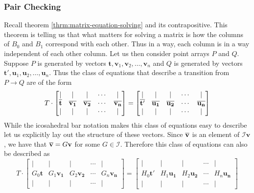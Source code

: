\documentclass[a4paper,10pt]{article}
\theoremstyle{plain}
\theoremstyle{definition}
\theoremstyle{remark}
\renewcommand{\vec}[1]{\mathbf{#1}}
\begin{document}
\subsubsection{Pair Checking}
Recall theorem \ref{thrm:matrix-equation-solving} and its contrapositive.
This theorem is telling us that what matters for solving a matrix is how the columns of \( B_0 \) and \( B_1 \) correspond with each other.
Thus in a way, each column is in a way independent of each other column.
Let us then consider point arrays \( P \) and \( Q \).
Suppose \( P \) is generated by vectors \(\vec{t}, \vec{v}_1, \vec{v}_2, \dots, \vec{v}_n\) and \( Q \) is generated by vectors \(\vec{t'}, \vec{u}_1, \vec{u}_2, \dots, \vec{u}_n\).
Thus the class of equations that describe a transition from \( P \to Q \) are of the form
\begin{equation*}
	T
	\cdot
	\begin{bmatrix}
		| & | & | & \cdots & | \\
		\icobar{t} & \icobar{v_1} & \icobar{v_2} & \cdots & \icobar{v_n} \\
		| & | & | & \cdots & |
	\end{bmatrix}
	=
	\begin{bmatrix}
		| & | & | & \cdots & | \\
		\icobar{t'} & \icobar{u_1} & \icobar{u_2} & \cdots & \icobar{u_n} \\
		| & | & | & \cdots & |
	\end{bmatrix}
\end{equation*}
While the icosahedral bar notation makes this class of equations easy to describe let us explicitly lay out the structure of these vectors.
Since \( \icobar{v} \) is an element of \( \mathcal{I}\vec{v} \), we have that \( \icobar{v} = G\vec{v} \) for some \( G \in \mathcal{I} \).
Therefore this class of equations can also be described as
\begin{equation*}
	T
	\cdot
	\begin{bmatrix}
		| & | & | & \cdots & | \\
		G_0\vec{t} & G_1\vec{v_1} & G_2\vec{v_2} & \cdots & G_n\vec{v_n} \\
		| & | & | & \cdots & |
	\end{bmatrix}
	=
	\begin{bmatrix}
		| & | & | & \cdots & | \\
		H_0\vec{t'} & H_1\vec{u_1} & H_2\vec{u_2} & \cdots & H_n\vec{u_n} \\
		| & | & | & \cdots & |
	\end{bmatrix}
\end{equation*}
\end{document}
